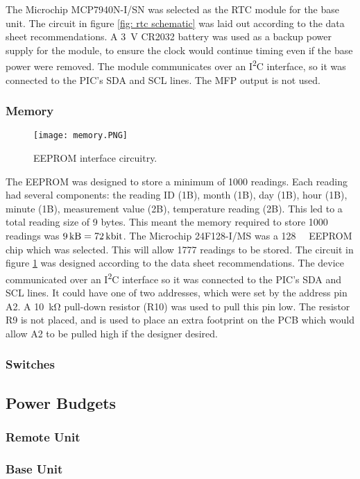 The Microchip MCP7940N-I/SN \cite{rtc} was selected as the RTC module for the base unit. The circuit in figure \ref{fig: rtc schematic} was laid out according to the data sheet \cite{rtc} recommendations. A \SI{3}{\volt} CR2032 battery was used as a backup power supply for the module, to ensure the clock would continue timing even if the base power were removed. The module communicates over an I\textsuperscript{2}C interface, so it was connected to the PIC's SDA and SCL lines. The MFP output is not used.



\subsubsection{Memory}
\begin{figure}[htbp]
	\texttt{[image: memory.PNG]}
	\caption{EEPROM interface circuitry.}
	\label{fig: memory schematic}
\end{figure}

The EEPROM was designed to store a minimum of 1000 readings. Each reading had several components: the reading ID (1B), month (1B), day (1B), hour (1B), minute (1B), measurement value (2B), temperature reading (2B). This led to a total reading size of 9 bytes. This meant the memory required to store 1000 readings was $\SI{9}{\kilo\byte}=\SI{72}{\kilo\bit}$. The Microchip 24F128-I/MS \cite{memory} was a \SI{128}{\kilo\bit} EEPROM chip which was selected. This will allow 1777 readings to be stored. The circuit in figure \ref{fig: memory schematic} was designed according to the data sheet \cite{memory} recommendations. The device communicated over an I\textsuperscript{2}C interface so it was connected to the PIC's SDA and SCL lines. It could have one of two addresses, which were set by the address pin A2. A \SI{10}{\kilo\ohm} pull-down resistor (R10) was used to pull this pin low. The resistor R9 is not placed, and is used to place an extra footprint on the PCB which would allow A2 to be pulled high if the designer desired.\\



\subsubsection{Switches}





\subsection{Power Budgets}
\subsubsection{Remote Unit}



\subsubsection{Base Unit}